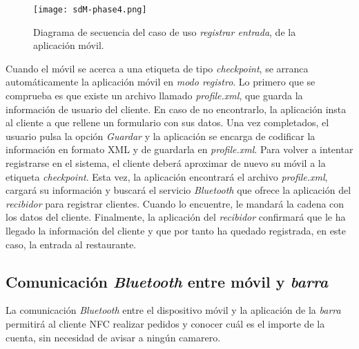   \begin{sidewaysfigure}[!h]
    \begin{center}
      \texttt{[image: sdM-phase4.png]}
      \caption{Diagrama de secuencia del caso de uso \emph{registrar entrada},
      de la aplicación móvil.}
      \label{fig:sdM-phase4}
    \end{center}
  \end{sidewaysfigure}

Cuando el móvil se acerca a una etiqueta de tipo \emph{checkpoint}, se
arranca automáticamente la aplicación móvil en \emph{modo registro}. Lo
primero que se comprueba es que existe un archivo llamado \emph{profile.xml},
que guarda la información de usuario del cliente. En caso de no encontrarlo,
la aplicación insta al cliente a que rellene un formulario con sus datos.
Una vez completados, el usuario pulsa la opción \emph{Guardar} y la
aplicación se encarga de codificar la información en formato \acs{XML} y de
guardarla en \emph{profile.xml}. Para volver a intentar registrarse en el
sistema, el cliente deberá aproximar de nuevo su móvil a la etiqueta
\emph{checkpoint}. Esta vez, la aplicación encontrará el archivo
\emph{profile.xml}, cargará su información y buscará el servicio
\emph{Bluetooth} que ofrece la aplicación del \emph{recibidor} para
registrar clientes. Cuando lo encuentre, le mandará la cadena con los datos
del cliente. Finalmente, la aplicación del \emph{recibidor} confirmará que
le ha llegado la información del cliente y que por tanto ha quedado
registrada, en este caso, la entrada al restaurante.


\subsection{Comunicación \emph{Bluetooth} entre móvil y \emph{barra}}
\label{subsec:mobile-bar}
La comunicación \emph{Bluetooth} entre el dispositivo móvil y la aplicación
de la \emph{barra} permitirá al cliente \acs{NFC} realizar pedidos y conocer
cuál es el importe de la cuenta, sin necesidad de avisar a ningún camarero.

